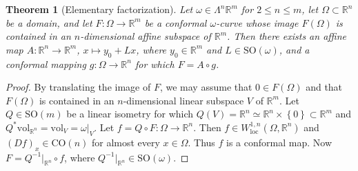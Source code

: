 \documentclass[a4paper,leqno,11pt]{amsart}
\numberwithin{equation}{section}
\newtheorem{theorem}{Theorem}[section]
\theoremstyle{remark}
\theoremstyle{remark}
\newcommand{\R}{\mathbb{R}}
\DeclareMathOperator{\loc}{loc}
\newcommand{\vol}{\mathrm{vol}}
\newcommand{\SO}{\mathrm{SO}}
\newcommand{\CO}{\mathrm{CO}}
\begin{document}
\begin{theorem}[Elementary factorization]
\label{thm:elementary-factorization} 
Let $\omega \in \Lambda^n \R^m$ for $2 \leq n \leq m$, let $\Omega \subset \R^n$ be a domain, and let $F\colon \Omega \to \R^m$ be a conformal $\omega$-curve whose image $F(\Omega)$ is contained in an $n$-dimensional affine subspace of $\R^m$. Then there exists an affine map $A\colon \R^n \to \R^m$, $x\mapsto y_0 + Lx$, where $y_0\in \R^m$ and $L \in \SO(\omega)$, and a conformal mapping $g \colon \Omega \to \R^n$ for which $F = A \circ g$.
\end{theorem}

\begin{proof}
By translating the image of $F$, we may assume that $0\in F(\Omega)$ and that $F(\Omega)$ is contained in an $n$-dimensional linear subspace $V$ of $\R^m$. Let $Q \in \SO(m)$ be a linear isometry for which $Q(V) = \R^n \simeq \mathbb{R}^{n} \times \left\{0\right\} \subset \R^m$ and $Q^*\vol_{\R^n} = \vol_V = \omega|_V$. Let $f=Q \circ F \colon \Omega \to \R^n$. Then $f\in W^{1,n}_{\loc}(\Omega, \R^n)$ and $(Df)_x\in \CO(n)$ for almost every $x\in \Omega$. Thus $f$ is a conformal map. Now $F = Q^{-1}|_{\R^n} \circ f$, where $Q^{-1}|_{\R^n} \in \SO(\omega)$.
\end{proof}







\end{document}
